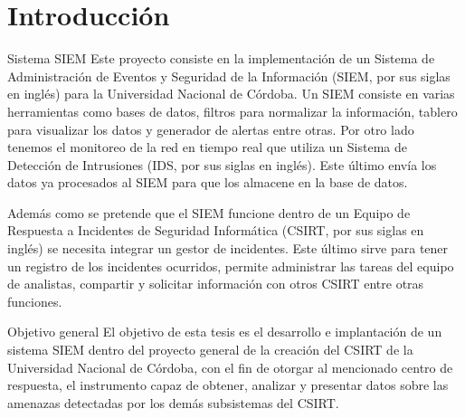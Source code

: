 \chapter{\Large Introducción}
    \begin{section}{Sistema SIEM}
        Este proyecto consiste en la implementación de un Sistema de Administración de Eventos y Seguridad de la Información (SIEM, por sus siglas en inglés) para la Universidad Nacional de Córdoba. Un SIEM consiste en varias herramientas como bases de datos, filtros para normalizar la información, tablero para visualizar los datos y generador de alertas entre otras. Por otro lado tenemos el monitoreo de la red en tiempo real que utiliza un Sistema de Detección de Intrusiones (IDS, por sus siglas en inglés). Este último envía los datos ya procesados al SIEM para que los almacene en la base de datos. \par
        Además como se pretende que el SIEM funcione dentro de un Equipo de Respuesta a Incidentes de Seguridad Informática (CSIRT, por sus siglas en inglés) se necesita integrar un gestor de incidentes. Este último sirve para tener un registro de los incidentes ocurridos, permite administrar las tareas del equipo de analistas, compartir y solicitar información con otros CSIRT entre otras funciones.
    \end{section}
    \begin{section}{Objetivo general}
        El objetivo de esta tesis es el desarrollo e implantación de un sistema SIEM dentro del proyecto general de la creación del CSIRT de la Universidad Nacional de Córdoba, con el fin de otorgar al mencionado centro de respuesta, el instrumento capaz de obtener, analizar y presentar datos sobre las amenazas detectadas por los demás subsistemas del CSIRT.
    \end{section}
    
